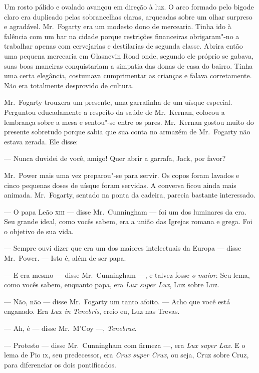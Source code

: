 Um rosto pálido e ovalado avançou em direção à luz.  O arco formado pelo bigode
claro era duplicado pelas sobrancelhas claras, arqueadas sobre um olhar
surpreso e agradável.  Mr.~Fogarty era um modesto dono de mercearia.  Tinha ido
à falência com um bar na cidade porque restrições financeiras obrigaram"-no a
trabalhar apenas com cervejarias e destilarias de segunda classe.  Abrira então
uma pequena mercearia em Glasnevin Road onde, segundo ele próprio se gabava,
suas boas maneiras conquistariam a simpatia das donas de casa do bairro.  Tinha
uma certa elegância, costumava cumprimentar as crianças e falava corretamente.
Não era totalmente desprovido de cultura.

Mr.~Fogarty trouxera um presente, uma garrafinha de um uísque especial.
Perguntou educadamente a respeito da saúde de Mr.~Kernan, colocou a lembrança
sobre a mesa e sentou"-se entre os pares.  Mr.~Kernan gostou muito do presente
sobretudo porque sabia que sua conta no armazém de Mr.~Fogarty não estava
zerada.  Ele disse:

--- Nunca duvidei de você, amigo!  Quer abrir a garrafa, Jack, por favor?

Mr.~Power mais uma vez preparou"-se para servir.  Os copos foram lavados e cinco
pequenas doses de uísque foram servidas.  A conversa ficou ainda mais animada.
Mr.~Fogarty, sentado na ponta da cadeira, parecia bastante interessado.

--- O papa Leão \textsc{xiii} --- disse Mr.~Cunningham --- foi um dos luminares da era.
Seu grande ideal, como vocês sabem, era a união das Igrejas romana e grega.
Foi o objetivo de sua vida.

--- Sempre ouvi dizer que era um dos maiores intelectuais da Europa --- disse
Mr.~Power.  --- Isto é, além de ser papa.

--- E era mesmo --- disse Mr.~Cunningham ---, e talvez fosse \textit{o maior}.
Seu lema, como vocês sabem, enquanto papa, era \textit{Lux super Lux}, Luz
sobre Luz.

--- Não, não --- disse Mr.~Fogarty um tanto afoito.  --- Acho que você está
enganado.  Era \textit{Lux in Tenebris}, creio eu, Luz nas Trevas.

--- Ah, é --- disse Mr.~M’Coy ---, \textit{Tenebrae}.

--- Protesto --- disse Mr.~Cunningham com firmeza ---, era \textit{Lux super
Lux}.  E o lema de Pio \textsc{ix}, seu predecessor, era \textit{Crux super Crux}, ou
seja, Cruz sobre Cruz, para diferenciar os dois pontificados.


